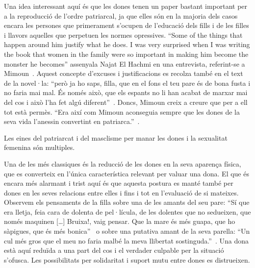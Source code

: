 Una idea interessant aquí és que les dones tenen un paper bastant important per a la reproducció de l'ordre patriarcal, ja que elles són en la majoria dels casos encara les persones que primerament s'ocupen de l'educació dels fills i de les filles i llavors aquelles que perpetuen les normes opressives.
``Some of the things that happen around him justify what he does. I was very surprised when I was writing the book that women in the family were so important in making him become the monster he becomes'' assenyala Najat El Hachmi en una entrevista, referint-se a Mimoun~\autocite{HaAM2011}.
Aquest concepte d'excuses i justificacions es recolza també en el text de la novel·la: ``però ja ho saps, filla, que en el fons el teu pare és de bona fusta i no faria mai mal. És només això, que els espants no li han acabat de marxar mai del cos i això l'ha fet algú diferent''~\autocite[18]{ElHachmi2008}.
Doncs, Mimoun creix a creure que per a ell tot està permès.
``Era així com Mimoun aconseguia sempre que les dones de la seva vida l'anessin convertint en patriarca.''~\autocite[99]{ElHachmi2008}.

Les eines del patriarcat i del masclisme per manar les dones i la sexualitat femenina són multiples.

Una de les més classiques és la reducció de les dones en la seva aparença física, que es converteix en l'única característica relevant per valuar una dona.
El que és encara més alarmant i trist aquí és que aquesta postura es manté també per dones en les seves relacions entre elles i fins i tot en l'evaluació de si mateixes.
Observem els pensaments de la filla sobre una de les amants del seu pare:
``Sí que era lletja, feia cara de dolenta de pel·lícula, de les dolentes que no sedueixen, que només maquinen [\ldots] Bruixa!, vaig pensar. Que la mare és més guapa, que ho sàpigues, que és més bonica''~\autocite[186]{ElHachmi2008}
o sobre una putativa amant de la seva parella:
``Un cul més gros que el meu no faria malbé la meva llibertat sostinguda.''~\autocite[308]{ElHachmi2008}.
Una dona està aquí reduïda a una part del cos i el verdader culpable per la situació s'ofusca.
Les possibilitats per solidaritat i suport mutu entre dones es distrueixen.

